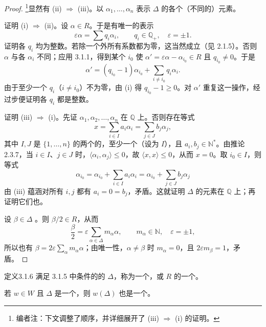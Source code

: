\begin{proof}
\footnote{编者注：下文调整了顺序，并详细展开了 (iii) $\Rightarrow$ (i) 的证明。}显然有 (ii) $\Rightarrow$ (iii)。以 $\alpha_1,\ldots,\alpha_n$ 表示 $\Delta$ 的各个（不同的）元素。

证明 (i) $\Rightarrow$ (ii)。设 $\alpha\in R$。于是有唯一的表示
\[\varepsilon\alpha=\sum q_i\alpha_i,\qquad q_i\in\mathbb Q_+,\quad\varepsilon=\pm1.\]
证明各 $q_i$ 均为整数。若除一个外所有系数都为零，这当然成立（见 2.1.5）。否则 $\alpha$ 与各 $\alpha_i$ 不同；应用 3.1.1，得到某个 $i_0$ 使 $\alpha'=\varepsilon\alpha-\alpha_{i_0}\in R$ 且 $q_{i_0}\ne0$。于是
\[\alpha'=(q_{i_0}-1)\alpha_{i_0}+\sum_{i\ne i_0}q_i\alpha_i.\]
由于至少一个 $q_i$（$i\ne i_0$）不为零，由 (i) 得 $q_{i_0}-1\geq0$。对 $\alpha'$ 重复这一操作，经过步便证明各 $q_i$ 都是整数。

证明 (iii) $\Rightarrow$ (i)。先证 $\alpha_1,\alpha_2,\ldots,\alpha_n$ 在 $\mathbb Q$ 上。否则存在等式
\[x=\sum_{i\in I}a_i\alpha_i=\sum_{j\in J}b_j\alpha_j,\]
其中 $I,J$ 是 $\{1,\ldots,n\}$ 的两个的，至少一个（设为 $I$），且 $a_i,b_j\in\mathbb N^*$。由推论 2.3.7，当 $i\in I$、$j\in J$ 时，$\langle\alpha_i,\alpha_j\rangle\leq0$，故 $\langle x,x\rangle\leq0$，从而 $x=0$。取 $i_0\in I$，则等式
\[\alpha_{i_0}=\alpha_{i_0}+\sum_{i\in I}a_i\alpha_i
=\alpha_{i_0}+\sum_{j\in J}b_j\alpha_j\]
由 (iii) 蕴涵对所有 $i,j$ 都有 $a_i=0=b_j$，矛盾。这就证明 $\Delta$ 的元素在 $\mathbb Q$ 上；再证明它们也。

设 $\beta\in\Delta$ 。则 $\beta/2\in R$，从而
\[\frac\beta2=\varepsilon\sum_{\alpha\in\Delta}m_\alpha\alpha,\qquad m_\alpha\in\mathbb N,\quad\varepsilon=\pm1,\]
所以也有 $\beta=2\varepsilon\sum_\alpha m_\alpha\alpha$；由唯一性，$\alpha\ne\beta$ 时 $m_\alpha=0$，且 $2\varepsilon m_\beta=1$，矛盾。
\end{proof}
\begin{SGAresult}{定义}{3.1.6}
满足 3.1.5 中条件的的 $\Delta$，称为一个，或 $R$ 的一个。

若 $w\in W$ 且 $\Delta$ 是一个，则 $w(\Delta)$ 也是一个。
\end{SGAresult}

